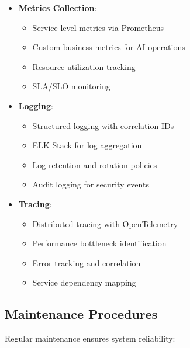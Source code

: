 \begin{itemize}
    \item \textbf{Metrics Collection}:
    \begin{itemize}
        \item Service-level metrics via Prometheus
        \item Custom business metrics for AI operations
        \item Resource utilization tracking
        \item SLA/SLO monitoring
    \end{itemize}

    \item \textbf{Logging}:
    \begin{itemize}
        \item Structured logging with correlation IDs
        \item ELK Stack for log aggregation
        \item Log retention and rotation policies
        \item Audit logging for security events
    \end{itemize}

    \item \textbf{Tracing}:
    \begin{itemize}
        \item Distributed tracing with OpenTelemetry
        \item Performance bottleneck identification
        \item Error tracking and correlation
        \item Service dependency mapping
    \end{itemize}
\end{itemize}

\subsection{Maintenance Procedures}

Regular maintenance ensures system reliability:

